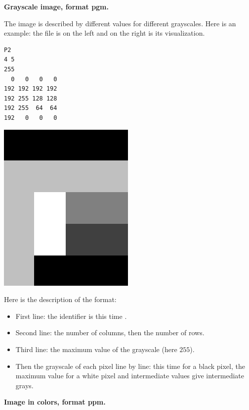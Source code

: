 \documentclass[11pt,class=report,crop=false]{standalone}
\begin{document}
\begin{cours}
\medskip

\textbf{Grayscale image, format \og{}pgm\fg{}.}

The image is described by different values for different grayscales.
Here is an example: the file  is on the left and on the right is its visualization.
\begin{center}
\begin{minipage}{0.3\textwidth}
\begin{lstlisting}
P2
4 5
255
  0   0   0   0
192 192 192 192
192 255 128 128
192 255  64  64
192   0   0   0
\end{lstlisting}
\end{minipage}
\begin{minipage}{0.3\textwidth}
\includegraphics[scale=\myscale,scale=0.2]{screen-lesson-image_gris}
\end{minipage}
\end{center}

Here is the description of the format:
\begin{itemize}
  \item First line: the identifier is this time .
  \item Second line: the number of columns, then the number of rows.
  \item Third line: the maximum value of the grayscale (here $255$).
  \item Then the grayscale of each pixel line by line: this time  for a black pixel, the maximum value for a white pixel and intermediate values give intermediate grays. 
\end{itemize}  

\medskip

\textbf{Image in colors, format \og{}ppm\fg{}.}



\end{cours}
\end{document}

